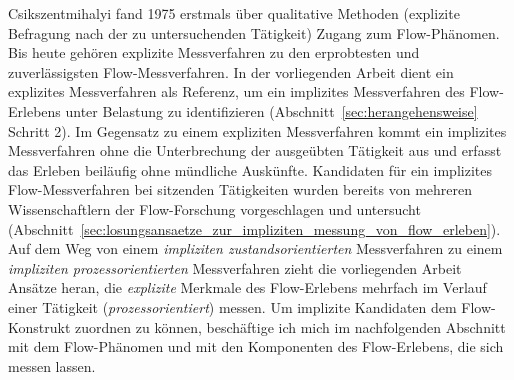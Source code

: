 
Csikszentmihalyi fand 1975 erstmals über qualitative Methoden (explizite Befragung nach der zu untersuchenden Tätigkeit) Zugang zum Flow-Phänomen. Bis heute gehören explizite Messverfahren zu den erprobtesten und zuverlässigsten Flow-Messverfahren. In der vorliegenden Arbeit dient ein explizites Messverfahren als Referenz, um ein implizites Messverfahren des Flow-Erlebens unter Belastung zu identifizieren (Abschnitt~\ref{sec:herangehensweise} Schritt 2). Im Gegensatz zu einem expliziten Messverfahren kommt ein implizites Messverfahren ohne die Unterbrechung der ausgeübten Tätigkeit aus und erfasst das Erleben beiläufig ohne mündliche Auskünfte. Kandidaten für ein implizites Flow-Messverfahren bei sitzenden Tätigkeiten wurden bereits von mehreren Wissenschaftlern der Flow-Forschung vorgeschlagen und untersucht (Abschnitt~\ref{sec:losungsansaetze_zur_impliziten_messung_von_flow_erleben}). Auf dem Weg von einem \emph{impliziten zustandsorientierten} Messverfahren zu einem \emph{impliziten prozessorientierten} Messverfahren zieht die vorliegenden Arbeit Ansätze heran, die \emph{explizite} Merkmale des Flow-Erlebens mehrfach im Verlauf einer Tätigkeit (\emph{prozessorientiert}) messen. Um implizite Kandidaten dem Flow-Konstrukt zuordnen zu können, beschäftige ich mich im nachfolgenden Abschnitt mit dem Flow-Phänomen und mit den Komponenten des Flow-Erlebens, die sich messen lassen.
